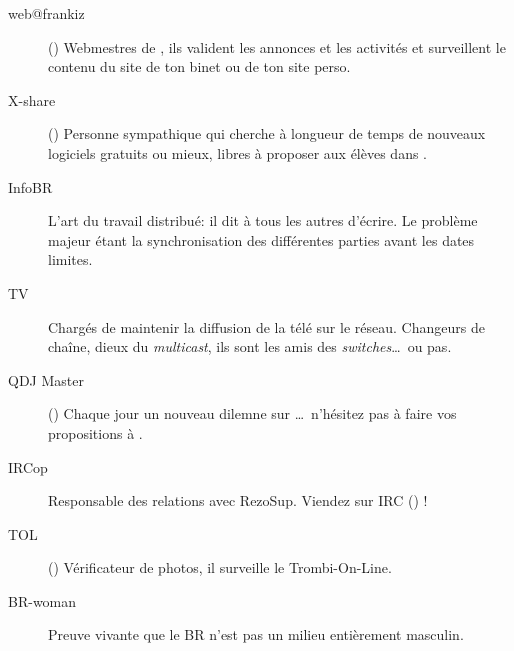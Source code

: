 \begin{description}
  \item[web@frankiz] {() Webmestres de \fkz, ils valident les annonces et les activit\'es et surveillent le contenu du site de ton binet ou de ton site perso.}

  \item[X-share] {() Personne sympathique qui cherche \`a longueur de temps de nouveaux logiciels gratuits ou mieux, libres \`a proposer aux \'el\`eves dans \xshare.}

  \item[InfoBR]{L'art du travail distribu\'e: il dit \`a tous les autres d'\'ecrire. Le probl\`eme majeur \'etant la synchronisation des diff\'erentes parties avant les dates limites.}

  \item[TV]{Charg\'es de maintenir la diffusion de la t\'el\'e sur le r\'eseau. Changeurs de cha\^ine, dieux du \emph{multicast}, ils sont les amis des \emph{switches}\dots\ ou pas.}

  \item[QDJ Master] {() Chaque jour un nouveau dilemne sur \fkz\dots\ n'h\'esitez pas \`a faire vos propositions \`a .}

  \item[IRCop]{Responsable des relations avec RezoSup. Viendez sur IRC () !}

  \item[TOL] {() V\'erificateur de photos, il surveille le Trombi-On-Line.}

  \item[BR-woman]{Preuve vivante que le BR n'est pas un milieu enti\`erement masculin.}

\end{description}

